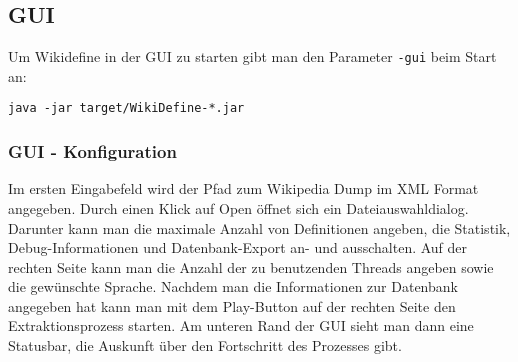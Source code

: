 \documentclass[12pt]{article}
\begin{document}
\subsection{GUI}
Um Wikidefine in der GUI zu starten gibt man den Parameter \texttt{-gui} beim Start an:
\begin{lstlisting}
java -jar target/WikiDefine-*.jar
\end{lstlisting}
\subsubsection{GUI - Konfiguration}
Im ersten Eingabefeld wird der Pfad zum Wikipedia Dump im XML Format angegeben. Durch einen Klick auf Open \"offnet sich ein Dateiauswahldialog. Darunter kann man die maximale Anzahl von Definitionen angeben, die Statistik, Debug-Informationen und Datenbank-Export an- und ausschalten. Auf der rechten Seite kann man die Anzahl der zu benutzenden Threads angeben sowie die gew\"unschte Sprache. Nachdem man die Informationen zur Datenbank angegeben hat kann man mit dem Play-Button auf der rechten Seite den Extraktionsprozess starten. Am unteren Rand der GUI sieht man dann eine Statusbar, die Auskunft \"uber den Fortschritt des Prozesses gibt.


\end{document}
